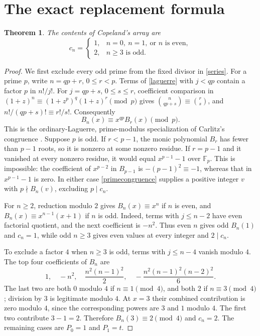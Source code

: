 \documentclass[11pt]{article}
\newtheorem{theorem}{Theorem}
\begin{document}
\section{The exact replacement formula}
\begin{theorem}\label{content}
The contents of Copeland's array are
\begin{equation}\label{answer}
 c_n=\begin{cases}
 1,& n=0,\ n=1,\ \text{or }n\text{ is even},\\
 2,& n\geq3\text{ is odd}.
 \end{cases}
\end{equation}
\end{theorem}
\begin{proof}
We first exclude every odd prime from the fixed divisor in \eqref{series}.
For a prime $p$, write $n=qp+r$, $0\leq r<p$. Terms of
\eqref{laguerre} with $j<qp$ contain a factor $p$ in $n!/j!$.
For $j=qp+s$, $0\leq s\leq r$, coefficient comparison in
$(1+z)^n\equiv(1+z^p)^q(1+z)^r\pmod p$ gives
$\binom n{qp+s}\equiv\binom rs$, and $n!/(qp+s)!\equiv r!/s!$.
Consequently
\begin{equation}\label{primecongruence}
 B_n(x)\equiv x^{qp}B_r(x)\pmod p.
\end{equation}
This is the ordinary-Laguerre, prime-modulus specialization of Carlitz's
congruence \cite[Theorem 3, (4.8)]{carlitz}.
Suppose $p$ is odd. If $r<p-1$, the monic polynomial $B_r$ has fewer
than $p-1$ roots, so it is nonzero at some nonzero residue.
If $r=p-1$ and it vanished at every nonzero residue, it would equal
$x^{p-1}-1$ over $\mathbb F_p$. This is impossible: the coefficient of
$x^{p-2}$ in $B_{p-1}$ is $-(p-1)^2\equiv-1$, whereas that in
$x^{p-1}-1$ is zero. In either case \eqref{primecongruence} supplies
a positive integer $v$ with $p\nmid B_n(v)$, excluding $p\mid c_n$.

For $n\geq2$, reduction modulo $2$ gives $B_n(x)\equiv x^n$ if $n$
is even, and $B_n(x)\equiv x^{n-1}(x+1)$ if $n$ is odd.
Indeed, terms with $j\leq n-2$ have even factorial quotient, and the
next coefficient is $-n^2$. Thus even $n$ gives odd $B_n(1)$ and
$c_n=1$, while odd $n\geq3$ gives even values at every integer and
$2\mid c_n$.

To exclude a factor $4$ when $n\geq3$ is odd, terms with $j\leq n-4$
vanish modulo $4$. The top four coefficients of $B_n$ are
\[
 1,\quad -n^2,\quad \frac{n^2(n-1)^2}{2},\quad
 -\frac{n^2(n-1)^2(n-2)^2}{6}.
\]
The last two are both $0$ modulo $4$ if $n\equiv1\pmod4$, and both
$2$ if $n\equiv3\pmod4$; division by $3$ is legitimate modulo $4$.
At $x=3$ their combined contribution is zero modulo $4$, since the
corresponding powers are $3$ and $1$ modulo $4$. The first two
contribute $3-1=2$. Therefore $B_n(3)\equiv2\pmod4$ and $c_n=2$.
The remaining cases are $P_0=1$ and $P_1=t$.
\end{proof}
\end{document}
